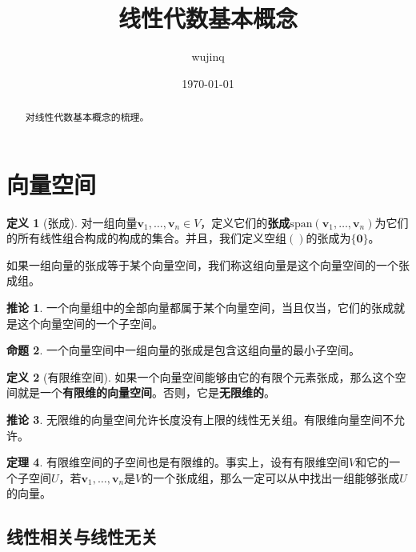 \documentclass[UTF8]{ctexart}
\title{线性代数基本概念}
\author{wujinq}
\date{\today}
\theoremstyle{definition}
\newtheorem{theorem}{\textbf{定理}}[section]
\newtheorem{definition}{\textbf{定义}}[section]
\newtheorem{proposition}[theorem]{\textbf{命题}}
\newtheorem{corollary}[theorem]{\textbf{推论}}
\begin{document}
\maketitle

\begin{abstract}
    对线性代数基本概念的梳理。
\end{abstract}

\hypertarget{sec:vector-space}{%
\section{向量空间}\label{sec:vector-space}}

\begin{definition}[张成]
    \label{def:span}
    对一组向量$\boldsymbol{v}_1, \ldots, \boldsymbol{v}_n \in V$，定义它们的\textbf{张成}$\mathrm{span}(\boldsymbol{v}_1, \ldots, \boldsymbol{v}_n)$为它们的所有线性组合构成的构成的集合。并且，我们定义空组$()$的张成为$\{\boldsymbol{0}\}$。

    如果一组向量的张成等于某个向量空间，我们称这组向量是这个向量空间的一个张成组。
\end{definition}

\begin{corollary}
    一个向量组中的全部向量都属于某个向量空间，当且仅当，它们的张成就是这个向量空间的一个子空间。
\end{corollary}

\begin{proposition}
    一个向量空间中一组向量的张成是包含这组向量的最小子空间。
\end{proposition}

\begin{definition}[有限维空间]
    如果一个向量空间能够由它的有限个元素张成，那么这个空间就是一个\textbf{有限维的向量空间}。否则，它是\textbf{无限维的}。
\end{definition}

\begin{corollary}
    无限维的向量空间允许长度没有上限的线性无关组。有限维向量空间不允许。
\end{corollary}

\begin{theorem}
    有限维空间的子空间也是有限维的。事实上，设有有限维空间$V$和它的一个子空间$U$，若$\boldsymbol{v}_1, \ldots, \boldsymbol{v}_n$是$V$的一个张成组，那么一定可以从中找出一组能够张成$U$的向量。
\end{theorem}

\hypertarget{sec:linear-correlation}{%
\subsection{线性相关与线性无关}\label{sec:linear-correlation}}
\end{document}
